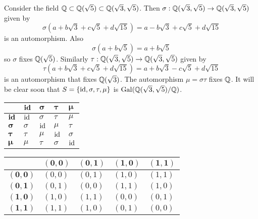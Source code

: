 \begin{example}
    Consider the field $\mathbb{Q} \subset \mathbb{Q}(\sqrt5) \subset \mathbb{Q}(\sqrt3, \sqrt5)$. Then $\sigma: \mathbb{Q}(\sqrt3,\sqrt5)\to\mathbb{Q}(\sqrt3,\sqrt5)$ given by
    \[
        \sigma(a + b\sqrt3 + c\sqrt5 + d\sqrt{15}) = a - b\sqrt3 + c\sqrt5 + d\sqrt{15}
    \]
    is an automorphism. Also
    \[
        \sigma(a + b\sqrt{5}) = a+b\sqrt5
    \]
    so $\sigma$ fixes $\mathbb{Q}(\sqrt5)$. Similarly $\tau: \mathbb{Q}(\sqrt3,\sqrt5)\to\mathbb{Q}(\sqrt3,\sqrt5)$ given by
    \[
        \tau(a + b\sqrt3 + c\sqrt5 + d\sqrt{15}) = a + b\sqrt3 - c\sqrt5 + d\sqrt{15}
    \]
    is an automorphism that fixes $\mathbb{Q}(\sqrt3)$. The automorphism $\mu = \sigma\tau$ fixes $\mathbb{Q}$. It will be clear soon that $S = \{\mathrm{id}, \sigma, \tau, \mu\}$ is $\mathrm{Gal}(\mathbb{Q}(\sqrt3,\sqrt5)/\mathbb{Q})$.

    \begin{minipage}[c]{0.475\textwidth}
        \begin{table}[H]
            \centering
            \begin{tabular}{|l|l|l|l|l|}
                \hline
                & $\boldsymbol{\mathrm{id}}$ & $\boldsymbol{\sigma}$ & $\boldsymbol{\tau}$ & $\boldsymbol{\mu}$ \\ \hline
                $\boldsymbol{\mathrm{id}}$ & $\mathrm{id}$ & $\sigma$ & $\tau$ & $\mu$ \\ \hline
                $\boldsymbol{\sigma}$ & $\sigma$ & $\mathrm{id}$ & $\mu$ & $\tau$ \\ \hline
                $\boldsymbol{\tau}$ & $\tau$ & $\mu$ & $\mathrm{id}$ & $\sigma$ \\ \hline
                $\boldsymbol{\mu}$ & $\mu$ & $\tau$ & $\sigma$ & $\mathrm{id}$ \\ \hline
            \end{tabular}
        \end{table}
    \end{minipage}
    \begin{minipage}[c]{0.475\textwidth}
        \begin{table}[H]
            \centering
            \begin{tabular}{|l|l|l|l|l|}
                \hline
                & $\boldsymbol{(0, 0)}$ & $\boldsymbol{(0, 1)}$ & $\boldsymbol{(1, 0)}$ & $\boldsymbol{(1, 1)}$ \\ \hline
                $\boldsymbol{(0, 0)}$ & $(0, 0)$ & $(0, 1)$ & $(1, 0)$ & $(1, 1)$ \\ \hline
                $\boldsymbol{(0, 1)}$ & $(0, 1)$ & $(0, 0)$ & $(1, 1)$ & $(1, 0)$ \\ \hline
                $\boldsymbol{(1, 0)}$ & $(1, 0)$ & $(1, 1)$ & $(0, 0)$ & $(0, 1)$ \\ \hline
                $\boldsymbol{(1, 1)}$ & $(1, 1)$ & $(1, 0)$ & $(0, 1)$ & $(0, 0)$ \\ \hline
            \end{tabular}
        \end{table}
    \end{minipage}


\end{example}
